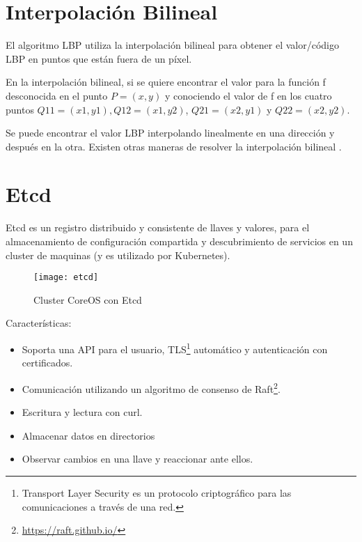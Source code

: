 \pagebreak
\chapter{Interpolación Bilineal}
El algoritmo LBP utiliza la interpolación bilineal para obtener el valor/código LBP en puntos que están fuera de un píxel. 

En la interpolación bilineal, si se quiere encontrar el valor para la función f desconocida en el punto \(P = (x, y)\) y conociendo el valor de f en los cuatro puntos \(Q11 = (x1, y1), Q12 = (x1, y2)\), \(Q21 = (x2, y1)\) y \(Q22 = (x2, y2)\).

Se puede encontrar el valor LBP interpolando linealmente en una dirección y después en la otra. Existen otras maneras de resolver la interpolación bilineal \cite{Banerjee2014-xj}.

\pagebreak
\chapter{Etcd}
Etcd \cite{CoreOS2016-cp} es un registro distribuido y consistente de llaves  y valores, para el almacenamiento de configuración compartida y descubrimiento de servicios en un cluster de maquinas (y es utilizado por Kubernetes).
    \begin{figure}[H]
        \centering
        \texttt{[image: etcd]}
        \caption{Cluster CoreOS con Etcd \protect\cite{CoreOS2016-zr}}
        \label{fig:coreos2016-etcd}
    \end{figure}
    \pagebreak
Características:
\begin{itemize}
\item Soporta una API para el usuario, TLS\footnote{Transport Layer Security es un protocolo criptográfico para las comunicaciones a través de una red.} automático y autenticación con certificados.
\item Comunicación utilizando un algoritmo de consenso de Raft\footnote{\url{https://raft.github.io/}}.
\item Escritura y lectura con curl.
\item Almacenar datos en directorios
\item Observar cambios en una llave y reaccionar ante ellos.


\end{itemize}
\pagebreak
